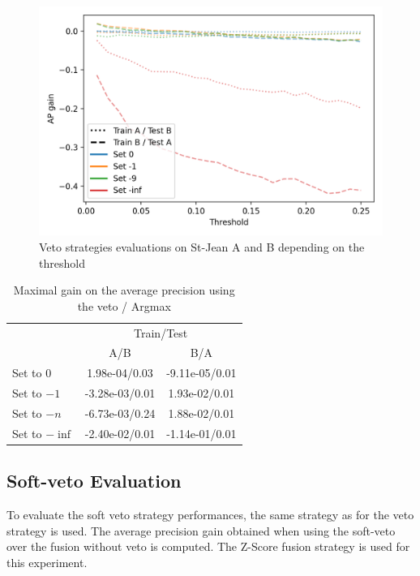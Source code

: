\begin{figure}
  \caption{Veto strategies evaluations on St-Jean A and B depending on the threshold}
  \label{fig:veto}
  \includegraphics[width=\linewidth]{img/veto.png}
\end{figure}

\begin{table}
  \centering
  \caption{Maximal gain on the average precision using the veto / Argmax}
  \label{tab:veto}
  \begin{tabular}{l c c}
    \toprule
                   & \multicolumn{2}{c}{Train/Test} \\
                   & A/B            & B/A \\
    \midrule
    Set to $0$     & 1.98e-04/0.03  & -9.11e-05/0.01 \\
    Set to $-1$    & -3.28e-03/0.01 & 1.93e-02/0.01 \\
    Set to $-n$    & -6.73e-03/0.24 & 1.88e-02/0.01 \\
    Set to $-\inf$ & -2.40e-02/0.01 & -1.14e-01/0.01 \\
    \bottomrule
  \end{tabular}
\end{table}

\subsection{Soft-veto Evaluation}

To evaluate the soft veto strategy performances, the same strategy as for the veto strategy is used.
The average precision gain obtained when using the soft-veto over the fusion without veto is computed.
The Z-Score fusion strategy is used for this experiment.

